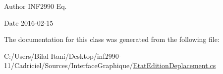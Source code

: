 \begin{DoxyAuthor}{Author}
I\+N\+F2990 Eq. 
\end{DoxyAuthor}
\begin{DoxyDate}{Date}
2016-\/02-\/15 
\end{DoxyDate}


The documentation for this class was generated from the following file\+:\begin{DoxyCompactItemize}
\item 
C\+:/\+Users/\+Bilal Itani/\+Desktop/inf2990-\/11/\+Cadriciel/\+Sources/\+Interface\+Graphique/\hyperlink{_etat_edition_deplacement_8cs}{Etat\+Edition\+Deplacement.\+cs}\end{DoxyCompactItemize}
